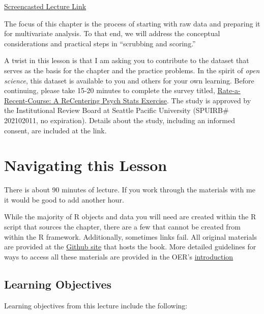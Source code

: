 \documentclass[
  11pt,
]{book}
\begin{document}
\href{https://youtube.com/playlist?list=PLtz5cFLQl4KPwGvx4MHxA7C1StPkHnFH3\&si=VzB-HVlJTS07FuFw}{Screencasted Lecture Link}

The focus of this chapter is the process of starting with raw data and preparing it for multivariate analysis. To that end, we will address the conceptual considerations and practical steps in ``scrubbing and scoring.''

A twist in this lesson is that I am asking you to contribute to the dataset that serves as the basis for the chapter and the practice problems. In the spirit of \emph{open science}, this dataset is available to you and others for your own learning. Before continuing, please take 15-20 minutes to complete the survey titled, \href{https://spupsych.az1.qualtrics.com/jfe/form/SV_b2cClqAlLGQ6nLU}{Rate-a-Recent-Course: A ReCentering Psych Stats Exercise}. The study is approved by the Institutional Review Board at Seattle Pacific University (SPUIRB\# 202102011, no expiration). Details about the study, including an informed consent, are included at the link.

\hypertarget{navigating-this-lesson}{%
\section{Navigating this Lesson}\label{navigating-this-lesson}}

There is about 90 minutes of lecture. If you work through the materials with me it would be good to add another hour.

While the majority of R objects and data you will need are created within the R script that sources the chapter, there are a few that cannot be created from within the R framework. Additionally, sometimes links fail. All original materials are provided at the \href{https://github.com/lhbikos/ReC_MultivModel}{Github site} that hosts the book. More detailed guidelines for ways to access all these materials are provided in the OER's \protect\hyperlink{ReCintro}{introduction}

\hypertarget{learning-objectives}{%
\subsection{Learning Objectives}\label{learning-objectives}}

Learning objectives from this lecture include the following:
\end{document}
